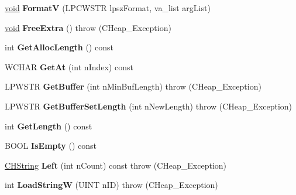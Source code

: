 \begin{DoxyCompactItemize}
\item 
\mbox{\label{class_c_h_string_aee186486460bc3ec0c5866896eebad7b}} 
\hyperlink{interfacevoid}{void} {\bfseries FormatV} (L\+P\+C\+W\+S\+TR lpsz\+Format, va\+\_\+list arg\+List)
\item 
\mbox{\label{class_c_h_string_ac9f994213bffd6d2a453fe5774295249}} 
\hyperlink{interfacevoid}{void} {\bfseries Free\+Extra} ()  throw (\+C\+Heap\+\_\+\+Exception)
\item 
\mbox{\label{class_c_h_string_abf7b72291b6251e34b65965e07df9347}} 
int {\bfseries Get\+Alloc\+Length} () const
\item 
\mbox{\label{class_c_h_string_a02afec716d2316c4b6f8da934d4771db}} 
W\+C\+H\+AR {\bfseries Get\+At} (int n\+Index) const
\item 
\mbox{\label{class_c_h_string_a7542e7ada888a9806abba4fe2d75a010}} 
L\+P\+W\+S\+TR {\bfseries Get\+Buffer} (int n\+Min\+Buf\+Length)  throw (\+C\+Heap\+\_\+\+Exception)
\item 
\mbox{\label{class_c_h_string_a08b2be67209b0968594178c65a375223}} 
L\+P\+W\+S\+TR {\bfseries Get\+Buffer\+Set\+Length} (int n\+New\+Length)  throw (\+C\+Heap\+\_\+\+Exception)
\item 
\mbox{\label{class_c_h_string_a2025bfe3d17a73b77abb740b59598450}} 
int {\bfseries Get\+Length} () const
\item 
\mbox{\label{class_c_h_string_af733b119c801ba7402e43e0fd2692317}} 
B\+O\+OL {\bfseries Is\+Empty} () const
\item 
\mbox{\label{class_c_h_string_a0a306375e6faced0109b4d06b8d1a331}} 
\hyperlink{class_c_h_string}{C\+H\+String} {\bfseries Left} (int n\+Count) const  throw (\+C\+Heap\+\_\+\+Exception)
\item 
\mbox{\label{class_c_h_string_a923ae97a3506e6ca5ec12a900f10ab43}} 
int {\bfseries Load\+StringW} (U\+I\+NT n\+ID)  throw (\+C\+Heap\+\_\+\+Exception)
\item 

\end{DoxyCompactItemize}
